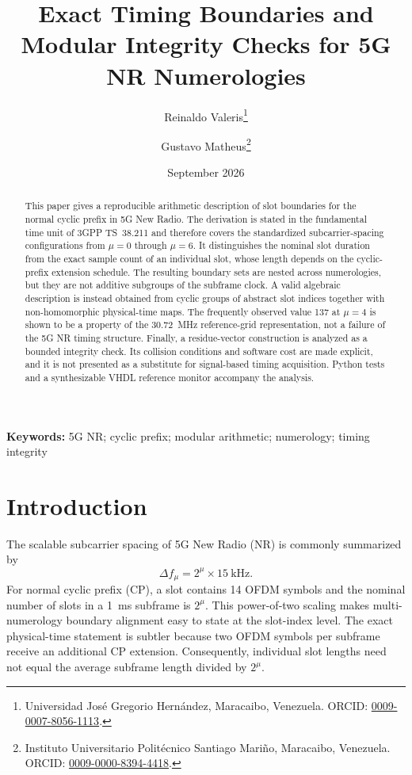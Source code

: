 \documentclass[11pt]{article}
\title{Exact Timing Boundaries and Modular Integrity Checks for 5G NR Numerologies}
\author{
Reinaldo Valeris\thanks{Universidad Jos\'e Gregorio Hern\'andez, Maracaibo, Venezuela. ORCID: \href{https://orcid.org/0009-0007-8056-1113}{0009-0007-8056-1113}.}
\and
Gustavo Matheus\thanks{Instituto Universitario Polit\'ecnico Santiago Mari\~no, Maracaibo, Venezuela. ORCID: \href{https://orcid.org/0009-0000-8394-4418}{0009-0000-8394-4418}.}
}
\date{September 2026}
\begin{document}
\maketitle

\begin{abstract}
This paper gives a reproducible arithmetic description of slot boundaries for the normal cyclic prefix in 5G New Radio.  The derivation is stated in the fundamental time unit of 3GPP TS~38.211 and therefore covers the standardized subcarrier-spacing configurations from $\mu=0$ through $\mu=6$.  It distinguishes the nominal slot duration from the exact sample count of an individual slot, whose length depends on the cyclic-prefix extension schedule.  The resulting boundary sets are nested across numerologies, but they are not additive subgroups of the subframe clock.  A valid algebraic description is instead obtained from cyclic groups of abstract slot indices together with non-homomorphic physical-time maps.  The frequently observed value 137 at $\mu=4$ is shown to be a property of the 30.72~MHz reference-grid representation, not a failure of the 5G NR timing structure.  Finally, a residue-vector construction is analyzed as a bounded integrity check.  Its collision conditions and software cost are made explicit, and it is not presented as a substitute for signal-based timing acquisition.  Python tests and a synthesizable VHDL reference monitor accompany the analysis.
\end{abstract}

\noindent\textbf{Keywords:} 5G NR; cyclic prefix; modular arithmetic; numerology; timing integrity

\section{Introduction}

The scalable subcarrier spacing of 5G New Radio (NR) is commonly summarized by
\begin{equation}
    \Delta f_\mu = 2^\mu \times 15\ \text{kHz}.
    \label{eq:scs}
\end{equation}
For normal cyclic prefix (CP), a slot contains 14 OFDM symbols and the nominal number of slots in a 1~ms subframe is $2^\mu$.  This power-of-two scaling makes multi-numerology boundary alignment easy to state at the slot-index level.  The exact physical-time statement is subtler because two OFDM symbols per subframe receive an additional CP extension.  Consequently, individual slot lengths need not equal the average subframe length divided by $2^\mu$.
\end{document}
